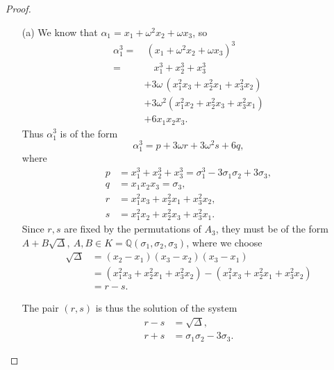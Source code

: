 \documentclass[11pt,a4paper]{article}
\newcommand{\Q}{\mathbb{Q}}
\begin{document}
\begin{proof}
\begin{enumerate}
\item[(a)]
We know that $\alpha_1 = x_1+\omega^2 x_2+\omega x_3$, so
\begin{align*}
\alpha_1^3 =&\ ( x_1+\omega^2 x_2+\omega x_3)^3\\
=&\quad x_1^3+x_2^3+x_3^3\\
&+3\omega\, (x_1^2x_3+x_2^2x_1+x_3^2x_2)\\
&+3\omega^2(x_1^2x_2+x_2^2x_3+x_3^2x_1)\\
&+6x_1x_2x_3.
\end{align*}
Thus  $\alpha_1^3$ is of the form
$$\alpha_1^3 = p + 3\omega r + 3 \omega^2 s + 6q,$$
where
\begin{align*} 
p &=x_1^3+x_2^3+x_3^3 = \sigma_1^3-3\sigma_1\sigma_2+3\sigma_3,\\
q &= x_1x_2x_3 = \sigma_3,\\
r&=x_1^2x_3+x_2^2x_1+x_3^2x_2,\\
s&=x_1^2x_2+x_2^2x_3+x_3^2x_1.
\end{align*}
Since $r,s$ are fixed by the permutations of $A_3$, they must be of the form $A+B\sqrt{\Delta}, \ A,B\in K = \Q(\sigma_1,\sigma_2,\sigma_3)$, where we choose
\begin{align*}
\sqrt{\Delta} &= (x_2-x_1)(x_3-x_2)(x_3-x_1)\\
&=(x_1^2x_3+x_2^2x_1+x_3^2x_2) -(x_1^2x_3+x_2^2x_1+x_3^2x_2)\\
&=r-s.
\end{align*}

The pair $(r,s)$ is thus the solution of the system
\begin{align*}
r-s&=\sqrt{\Delta},\\
r+s &= \sigma_1\sigma_2 - 3 \sigma_3.
\end{align*}


\end{enumerate}
\end{proof}
\end{document}
